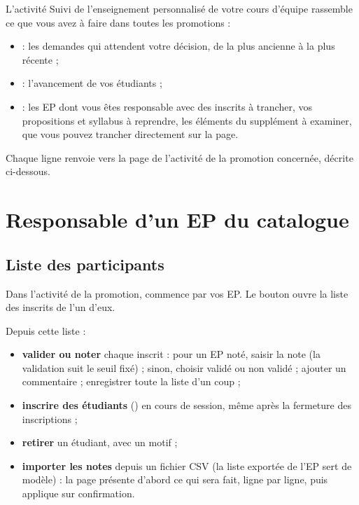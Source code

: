 \documentclass[11pt,a4paper]{article}
\begin{document}
L'activité \og Suivi de l'enseignement personnalisé\fg{} de votre cours d'équipe rassemble ce
que vous avez à faire dans toutes les promotions :
\begin{itemize}
  \item {} : les demandes qui attendent votre décision, de la plus ancienne à
    la plus récente ;
  \item {} : l'avancement de vos étudiants ;
  \item {} : les EP dont vous êtes responsable avec des inscrits à trancher,
    vos propositions et syllabus à reprendre, les éléments du supplément à examiner, que vous
    pouvez trancher directement sur la page.
\end{itemize}


Chaque ligne renvoie vers la page de l'activité de la promotion concernée, décrite ci-dessous.

\section{Responsable d'un EP du catalogue}

\subsection{Liste des participants}

Dans l'activité de la promotion,  commence par vos EP. Le bouton
 ouvre la liste des inscrits de l'un d'eux.


Depuis cette liste :
\begin{itemize}
  \item \textbf{valider ou noter} chaque inscrit : pour un EP noté, saisir la note (la
    validation suit le seuil fixé) ; sinon, choisir \og validé\fg{} ou \og non validé\fg{} ;
    ajouter un commentaire ; enregistrer toute la liste d'un coup ;
  \item \textbf{inscrire des étudiants} () en cours de session, même après la fermeture des
    inscriptions ;
  \item \textbf{retirer} un étudiant, avec un motif ;
  \item \textbf{importer les notes} depuis un fichier CSV (la liste exportée de l'EP sert de
    modèle) : la page présente d'abord ce qui sera fait, ligne par ligne, puis applique sur
    confirmation.
\end{itemize}
\end{document}
